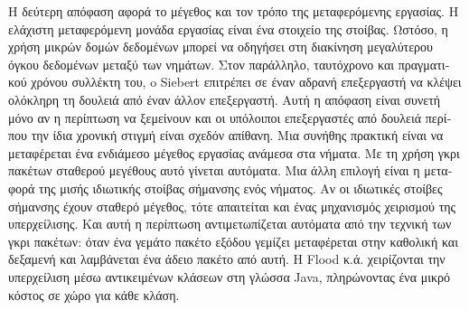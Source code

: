 \begin{greek}
Η δεύτερη απόφαση αφορά το μέγεθος και τον τρόπο της μεταφερόμενης
εργασίας. Η ελάχιστη μεταφερόμενη μονάδα εργασίας είναι ένα
στοιχείο της στοίβας. Ωστόσο, η χρήση μικρών δομών δεδομένων
μπορεί να οδηγήσει στη διακίνηση μεγαλύτερου όγκου δεδομένων
μεταξύ των νημάτων. Στον παράλληλο, ταυτόχρονο και πραγματικού
χρόνου συλλέκτη του, o Siebert \cite{DBLP:conf/iwmm/Siebert10}
επιτρέπει σε έναν αδρανή επεξεργαστή να κλέψει ολόκληρη τη
δουλειά από έναν άλλον επεξεργαστή. Αυτή η απόφαση είναι συνετή
μόνο αν η περίπτωση να ξεμείνουν και οι υπόλοιποι επεξεργαστές
από δουλειά περίπου την ίδια χρονική στιγμή είναι σχεδόν
απίθανη. Μια συνήθης πρακτική είναι να μεταφέρεται ένα ενδιάμεσο
μέγεθος εργασίας ανάμεσα στα νήματα. Με τη χρήση γκρι πακέτων
σταθερού μεγέθους αυτό γίνεται αυτόματα. Μια άλλη επιλογή
είναι η μεταφορά της μισής ιδιωτικής στοίβας σήμανσης ενός
νήματος. Αν οι ιδιωτικές στοίβες σήμανσης έχουν σταθερό
μέγεθος, τότε απαιτείται και ένας μηχανισμός χειρισμού της
υπερχείλισης. Και αυτή η περίπτωση αντιμετωπίζεται αυτόματα
από την τεχνική των γκρι πακέτων: όταν ένα γεμάτο πακέτο
εξόδου γεμίζει μεταφέρεται στην καθολική και δεξαμενή και
λαμβάνεται ένα άδειο πακέτο από αυτή. Η Flood κ.ά. 
\cite{DBLP:conf/jvm/FloodDSZ01} χειρίζονται την υπερχείλιση
μέσω αντικειμένων κλάσεων στη γλώσσα Java, πληρώνοντας ένα
μικρό κόστος σε χώρο για κάθε κλάση.


\end{greek}
